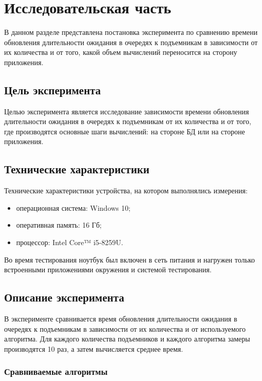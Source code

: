 \chapter{Исследовательская часть}

В данном разделе представлена постановка эксперимента по сравнению времени обновления длительности ожидания в очередях к подъемникам в зависимости от их количества и от того, какой объем вычислений переносится на сторону приложения.


\section{Цель эксперимента}

Целью эксперимента является исследование зависимости времени обновления длительности ожидания в очередях к подъемникам от их количества и от того, где производятся основные шаги вычислений: на стороне БД или на стороне приложения.

\section{Технические характеристики}

Технические характеристики устройства, на котором выполнялись измерения:

\begin{itemize}
	\item операционная система: Windows 10;
	\item оперативная память: 16 Гб;
	\item процессор: Intel Core™ i5-8259U.
\end{itemize}

Во время тестирования ноутбук был включен в сеть питания и нагружен только встроенными приложениями окружения и системой тестирования.


\section{Описание эксперимента}

В эксперименте сравнивается время обновления длительности ожидания в очередях к подъемникам в зависимости от их количества и от используемого алгоритма. Для каждого количества подъемников и каждого алгоритма замеры производятся 10 раз, а затем вычисляется среднее время.

\subsection{Сравниваемые алгоритмы}

